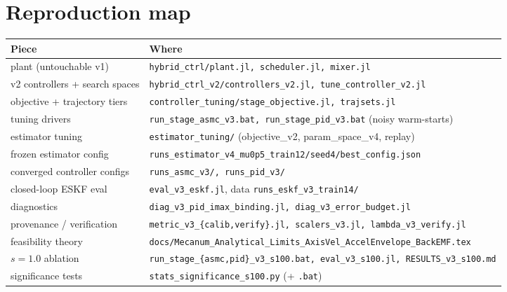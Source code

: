 \documentclass[11pt]{article}
\begin{document}
\section{Reproduction map}
\begin{center}\footnotesize
\begin{tabular}{ll}
\toprule
Piece & Where\\
\midrule
plant (untouchable v1) & \texttt{hybrid\_ctrl/plant.jl, scheduler.jl, mixer.jl}\\
v2 controllers + search spaces & \texttt{hybrid\_ctrl\_v2/controllers\_v2.jl, tune\_controller\_v2.jl}\\
objective + trajectory tiers & \texttt{controller\_tuning/stage\_objective.jl, trajsets.jl}\\
tuning drivers & \texttt{run\_stage\_asmc\_v3.bat, run\_stage\_pid\_v3.bat} (noisy warm-starts)\\
estimator tuning & \texttt{estimator\_tuning/} (objective\_v2, param\_space\_v4, replay)\\
frozen estimator config & \texttt{runs\_estimator\_v4\_mu0p5\_train12/seed4/best\_config.json}\\
converged controller configs & \texttt{runs\_asmc\_v3/, runs\_pid\_v3/}\\
closed-loop ESKF eval & \texttt{eval\_v3\_eskf.jl}, data \texttt{runs\_eskf\_v3\_train14/}\\
diagnostics & \texttt{diag\_v3\_pid\_imax\_binding.jl, diag\_v3\_error\_budget.jl}\\
provenance / verification & \texttt{metric\_v3\_\{calib,verify\}.jl, scalers\_v3.jl, lambda\_v3\_verify.jl}\\
feasibility theory & \texttt{docs/Mecanum\_Analytical\_Limits\_AxisVel\_AccelEnvelope\_BackEMF.tex}\\
$s{=}1.0$ ablation & \texttt{run\_stage\_\{asmc,pid\}\_v3\_s100.bat, eval\_v3\_s100.jl, RESULTS\_v3\_s100.md}\\
significance tests & \texttt{stats\_significance\_s100.py} (+ \texttt{.bat})\\
\bottomrule
\end{tabular}
\end{center}
\end{document}
